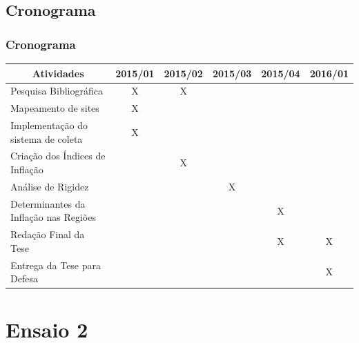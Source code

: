 \documentclass[aspectratio=169]{beamer}
\begin{document}
\subsection{Cronograma}

\begin{frame}\frametitle{Cronograma}
\begin{table}[h]
\begin{tabular}{llllll}
\hline
\multicolumn{1}{c}{\textbf{Atividades}} & 2015/01               & 2015/02               & 2015/03               & 2015/04               & 2016/01               \\ \hline
Pesquisa Bibliográfica                  & \multicolumn{1}{c}{X} & \multicolumn{1}{c}{X} &                       &                       &                       \\
Mapeamento de sites                     & \multicolumn{1}{c}{X} &                       &                       &                       &                       \\
Implementação do sistema de coleta      & \multicolumn{1}{c}{X} &                       &                       &                       &                       \\
Criação dos Índices de Inflação         &                       & \multicolumn{1}{c}{X} &                       &                       &                       \\
Análise de Rigidez                      &                       &                       & \multicolumn{1}{c}{X} &                       &                       \\
Determinantes da Inflação nas Regiões   &                       &                       &                       & \multicolumn{1}{c}{X} &                       \\
Redação Final da Tese                   &                       &                       &                       & \multicolumn{1}{c}{X} & \multicolumn{1}{c}{X} \\
Entrega da Tese para Defesa             &                       &                       &                       &                       & \multicolumn{1}{c}{X} \\ \hline
\end{tabular}
\end{table}
\end{frame}

\section{Ensaio 2}
  
\end{document}
